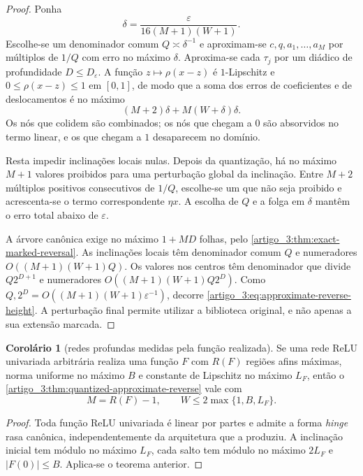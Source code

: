 \documentclass[12pt,a4paper]{article}
\theoremstyle{preciso}
\theoremstyle{definition}
\theoremstyle{preciso}
\theoremstyle{preciso}
\theoremstyle{preciso}
\theoremstyle{preciso}
\newtheorem{corollary}[teorema]{Corolário}
\theoremstyle{definition}
\theoremstyle{preciso}
\theoremstyle{definition}
\theoremstyle{preciso}
\theoremstyle{preciso}
\theoremstyle{definition}
\begin{document}
\begin{proof}
Ponha
\[
 \delta=\frac{\varepsilon}{16(M+1)(W+1)}.
\]
Escolhe-se um denominador comum $Q\asymp\delta^{-1}$ e aproximam-se
$c,q,a_1,\ldots,a_M$ por múltiplos de $1/Q$ com erro no máximo $\delta$.
Aproxima-se cada $\tau_j$ por um diádico de profundidade
$D\le D_\varepsilon$. A função $z\mapsto\rho(x-z)$ é $1$-Lipschitz e
$0\le\rho(x-z)\le1$ em $[0,1]$, de modo que a soma dos erros de coeficientes
e de deslocamentos é no máximo
\[
 (M+2)\delta+M(W+\delta)\delta.
\]
Os nós que colidem são combinados; os nós que chegam a $0$ são absorvidos no termo
linear, e os que chegam a $1$ desaparecem no domínio.

Resta impedir inclinações locais nulas. Depois da quantização, há no máximo
$M+1$ valores proibidos para uma perturbação global da inclinação. Entre
$M+2$ múltiplos positivos consecutivos de $1/Q$, escolhe-se um que não seja
proibido e acrescenta-se o termo correspondente $\eta x$. A escolha de $Q$ e a
folga em $\delta$ mantêm o erro total abaixo de $\varepsilon$.

A árvore canônica exige no máximo $1+MD$ folhas, pelo
\cref{artigo_3:thm:exact-marked-reversal}. As inclinações locais têm denominador comum
$Q$ e numeradores $O((M+1)(W+1)Q)$. Os valores nos centros têm denominador que
divide $Q2^{D+1}$ e numeradores
$O((M+1)(W+1)Q2^D)$. Como
$Q,2^D=O((M+1)(W+1)\varepsilon^{-1})$, decorre
\eqref{artigo_3:eq:approximate-reverse-height}. A perturbação final permite utilizar a
biblioteca original, e não apenas a sua extensão marcada.
\end{proof}

\begin{corollary}[redes profundas medidas pela função realizada]\label{map:artigo_3:5.6}
\label{artigo_3:cor:deep-functional-reverse}
Se uma rede ReLU univariada arbitrária realiza uma função $F$ com $R(F)$
regiões afins máximas, norma uniforme no máximo $B$ e constante de Lipschitz
no máximo $L_F$, então o \cref{artigo_3:thm:quantized-approximate-reverse} vale com
\begin{equation}
 M=R(F)-1,
 \qquad
 W\le2\max\{1,B,L_F\}.
 \label{artigo_3:eq:deep-realized-resources}
\end{equation}
\end{corollary}

\begin{proof}
Toda função ReLU univariada é linear por partes e admite a forma \emph{hinge} rasa
canônica, independentemente da arquitetura que a produziu. A inclinação
inicial tem módulo no máximo $L_F$, cada salto tem módulo no máximo $2L_F$ e
$|F(0)|\le B$. Aplica-se o teorema anterior.
\end{proof}
\end{document}
